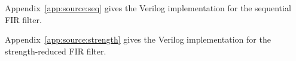 
\seqfilter
Appendix~\ref{app:source:seq} gives the Verilog implementation for the sequential FIR filter.

\strengthfilter
Appendix~\ref{app:source:strength} gives the Verilog implementation for the strength-reduced FIR filter.
